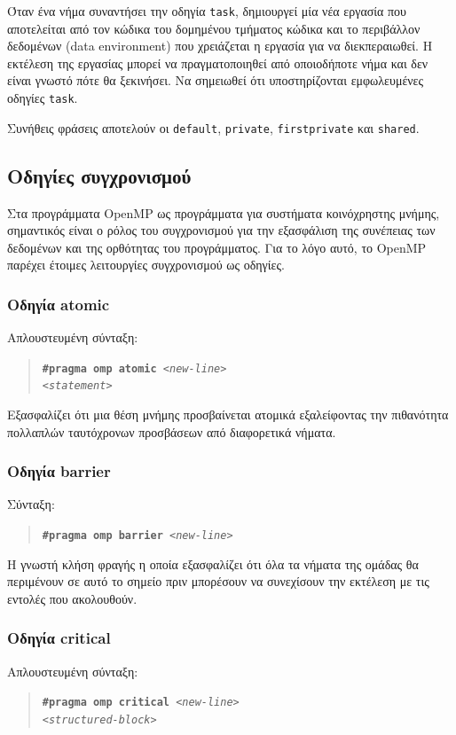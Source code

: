 Όταν ένα νήμα συναντήσει την οδηγία \texttt{task}, δημιουργεί μία νέα εργασία που αποτελείται από τον κώδικα του δομημένου τμήματος κώδικα και το περιβάλλον δεδομένων (data environment) που χρειάζεται η εργασία για να διεκπεραιωθεί. Η εκτέλεση της εργασίας μπορεί να πραγματοποιηθεί από οποιοδήποτε νήμα και δεν είναι γνωστό πότε θα ξεκινήσει. Να σημειωθεί ότι υποστηρίζονται εμφωλευμένες οδηγίες \texttt{task}.

Συνήθεις φράσεις αποτελούν οι \texttt{default}, \texttt{private}, \texttt{firstprivate} και \texttt{shared}.


\subsection{Οδηγίες συγχρονισμού}
Στα προγράμματα OpenMP ως προγράμματα για συστήματα κοινόχρηστης μνήμης, σημαντικός είναι ο ρόλος του συγχρονισμού για την εξασφάλιση της συνέπειας των δεδομένων και της ορθότητας του προγράμματος. Για το λόγο αυτό, το OpenMP παρέχει έτοιμες λειτουργίες συγχρονισμού ως οδηγίες.

\subsubsection{Οδηγία atomic}
Απλουστευμένη σύνταξη:
\begin{quote}
	\texttt{\textbf{\#pragma omp atomic} \textit{<new-line>}} \\
		\texttt{\textit{<statement>}}
\end{quote}

Εξασφαλίζει ότι μια θέση μνήμης προσβαίνεται ατομικά εξαλείφοντας την πιθανότητα πολλαπλών ταυτόχρονων προσβάσεων από διαφορετικά νήματα.

\subsubsection{Οδηγία barrier}
Σύνταξη:
\begin{quote}
	\texttt{\textbf{\#pragma omp barrier} \textit{<new-line>}}
\end{quote}

Η γνωστή κλήση φραγής η οποία εξασφαλίζει ότι όλα τα νήματα της ομάδας θα περιμένουν σε αυτό το σημείο πριν μπορέσουν να συνεχίσουν την εκτέλεση με τις εντολές που ακολουθούν.

\subsubsection{Οδηγία critical}
Απλουστευμένη σύνταξη:
\begin{quote}
	\texttt{\textbf{\#pragma omp critical} \textit{<new-line>}} \\
		\texttt{\textit{<structured-block>}}
\end{quote}

